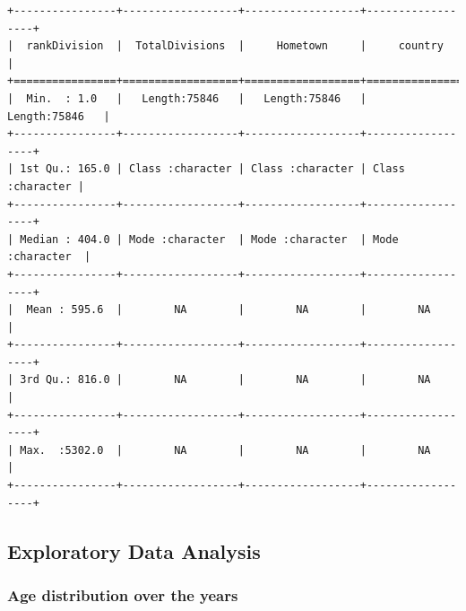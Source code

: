 \documentclass[
]{article}
\begin{document}
\begin{verbatim}
+----------------+------------------+------------------+------------------+
|  rankDivision  |  TotalDivisions  |     Hometown     |     country      |
+================+==================+==================+==================+
|  Min.  : 1.0   |   Length:75846   |   Length:75846   |   Length:75846   |
+----------------+------------------+------------------+------------------+
| 1st Qu.: 165.0 | Class :character | Class :character | Class :character |
+----------------+------------------+------------------+------------------+
| Median : 404.0 | Mode :character  | Mode :character  | Mode :character  |
+----------------+------------------+------------------+------------------+
|  Mean : 595.6  |        NA        |        NA        |        NA        |
+----------------+------------------+------------------+------------------+
| 3rd Qu.: 816.0 |        NA        |        NA        |        NA        |
+----------------+------------------+------------------+------------------+
| Max.  :5302.0  |        NA        |        NA        |        NA        |
+----------------+------------------+------------------+------------------+
\end{verbatim}

\newpage

\hypertarget{exploratory-data-analysis}{%
\subsection{Exploratory Data Analysis}\label{exploratory-data-analysis}}

\hypertarget{age-distribution-over-the-years}{%
\subsubsection{Age distribution over the
years}\label{age-distribution-over-the-years}}
\end{document}
